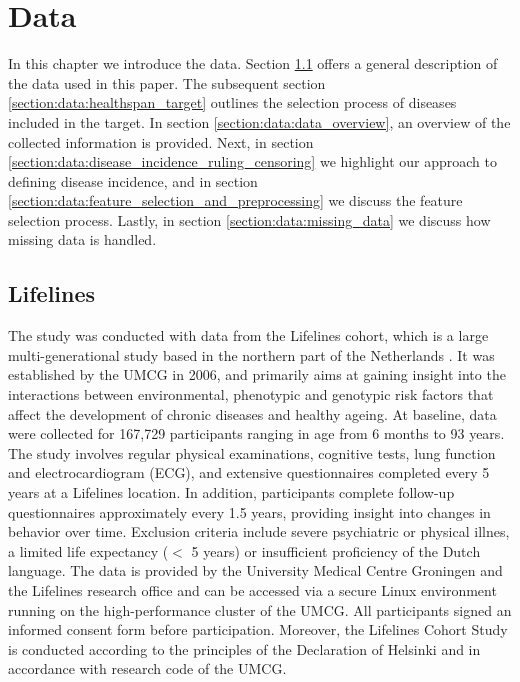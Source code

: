 \chapter{Data}
\label{chap:data}
In this chapter we introduce the data. Section \ref{section:data:data_description} offers a general description of the data used in this paper. The subsequent section \ref{section:data:healthspan_target} outlines the selection process of diseases included in the target. In section \ref{section:data:data_overview}, an overview of the collected information is provided. Next, in section \ref{section:data:disease_incidence_ruling_censoring} we highlight our approach to defining disease incidence, and in section \ref{section:data:feature_selection_and_preprocessing} we discuss the feature selection process. Lastly, in section \ref{section:data:missing_data} we discuss how missing data is handled. 

\section{Lifelines}
\label{section:data:data_description}
The study was conducted with data from the Lifelines cohort, which is a large multi-generational study based in the northern part of the Netherlands \citep{Lifelines}. It was established by the UMCG in 2006, and primarily aims at gaining insight into the interactions between environmental, phenotypic and genotypic risk factors that affect the development of chronic diseases and healthy ageing. At baseline, data were collected for 167,729 participants ranging in age from 6 months to 93 years. The study involves regular physical examinations, cognitive tests, lung function and electrocardiogram (ECG), and extensive questionnaires completed every 5 years at a Lifelines location. In addition, participants complete follow-up questionnaires approximately every 1.5 years, providing insight into changes in behavior over time.
Exclusion criteria include severe psychiatric or physical illnes, a limited life expectancy ($<$ 5 years) or insufficient proficiency of the Dutch language. The data is provided by the University Medical Centre Groningen and the Lifelines research office and can be accessed via a secure Linux environment running on the high-performance cluster of the UMCG. All participants signed an informed consent form before participation. Moreover, the Lifelines Cohort Study is conducted according to the principles of the Declaration of Helsinki and in accordance with research code of the UMCG.

